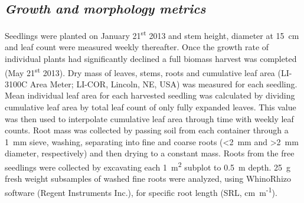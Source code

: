 \documentclass[a4paper]{article}\usepackage[]{graphicx}\usepackage[]{color}
\begin{document}
\subsection*{\textit{Growth and morphology metrics}}
Seedlings were planted on January 21\textsuperscript{st} 2013 and stem height, diameter at 15~cm and leaf count were measured weekly thereafter. Once the growth rate of individual plants had significantly declined a full biomass harvest was completed (May 21\textsuperscript{st} 2013). Dry mass of leaves, stems, roots and cumulative leaf area (LI-3100C Area Meter; LI-COR, Lincoln, NE, USA) was measured for each seedling. Mean individual leaf area for each harvested seedling was calculated by dividing cumulative leaf area by total leaf count of only fully expanded leaves. This value was then used to interpolate cumulative leaf area through time with weekly leaf counts. Root mass was collected by passing soil from each container through a 1~mm sieve, washing, separating into fine and coarse roots (\textless2~mm and \textgreater2~mm diameter, respectively) and then drying to a constant mass. Roots from the free seedlings were collected by excavating each 1~m\textsuperscript{2} subplot to 0.5~m depth.  25~g fresh weight subsamples of washed fine roots were analyzed, using WhinoRhizo software (Regent Instruments Inc.), for specific root length (SRL, cm~m\textsuperscript{-1}).
\end{document}
